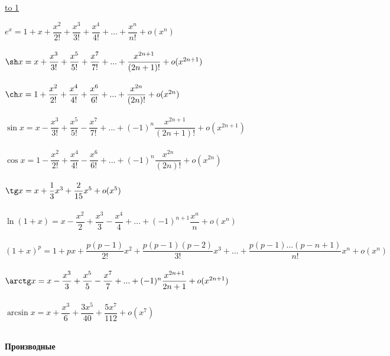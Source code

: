 \documentclass[12pt]{article}
\def\LINE{\vspace*{-1em}\noindent \underline{\hbox to 1\textwidth{{ } \hfil{ } \hfil{ } }}}
\newenvironment{formula}{
 
  \vspace*{-0.0em}
}{
  \vspace*{-0.0em}
  
}
\begin{document}
\vspace{-1em}
\LINE
\vspace{1em}
\pagestyle{fancy}
\begin{formula}
$e^x = 1 + x + \dfrac{x^2}{2!} + \dfrac{x^3}{3!} + \dfrac{x^4}{4!} + ... + \dfrac{x^n}{n!} + o(x^n)$\\
\\
$\sh x = x + \dfrac{x^3}{3!} + \dfrac{x^5}{5!} + \dfrac{x^7}{7!} + ... + \dfrac{x^{2n + 1}}{(2n + 1)!} + o(x^{2n + 1})$\\
\\
$\ch x = 1 + \dfrac{x^2}{2!} + \dfrac{x^4}{4!} + \dfrac{x^6}{6!} + ... + \dfrac{x^{2n}}{(2n)!} + o(x^{2n})$\\
\\
$\sin x = x - \dfrac{x^3}{3!} + \dfrac{x^5}{5!} - \dfrac{x^7}{7!} + ... + (-1)^n\dfrac{x^{2n + 1}}{(2n + 1)!} + o(x^{2n + 1})$\\
\\
$\cos x = 1 - \dfrac{x^2}{2!} + \dfrac{x^4}{4!} - \dfrac{x^6}{6!} + ... + (-1)^n\dfrac{x^{2n}}{(2n)!} + o(x^{2n})$\\
\\
$\tg x = x + \dfrac{1}{3}x^3 + \dfrac{2}{15}x^5 + o(x^5)$\\
\\
$\ln(1 + x) = x - \dfrac{x^2}{2} + \dfrac{x^3}{3} - \dfrac{x^4}{4} + \dots + (-1)^{n + 1}\dfrac{x^n}{n} + o(x^n)$\\
\\
$(1 + x)^p = 1 + px + \dfrac{p(p - 1)}{2!}x^2 + \dfrac{p(p - 1)(p - 2)}{3!}x^3 + \dots + \dfrac{p(p - 1)\dots(p - n + 1)}{n!}x^n + o(x^n)$\\
\\
$\arctg x = x - \dfrac{x^3}{3} + \dfrac{x^5}{5} - \dfrac{x^7}{7} + ... + (-1)^n\dfrac{x^{2n + 1}}{2n + 1} + o(x^{2n + 1})$\\
\\
$\arcsin x = x + \dfrac{x^3}{6} + \dfrac{3x^5}{40} + \dfrac{5x^7}{112} + o(x^{7})$\\
\\

\end{formula}

\begin{center}
  {\Large\bf 
   Производные}\\
\end{center}
\end{document}
